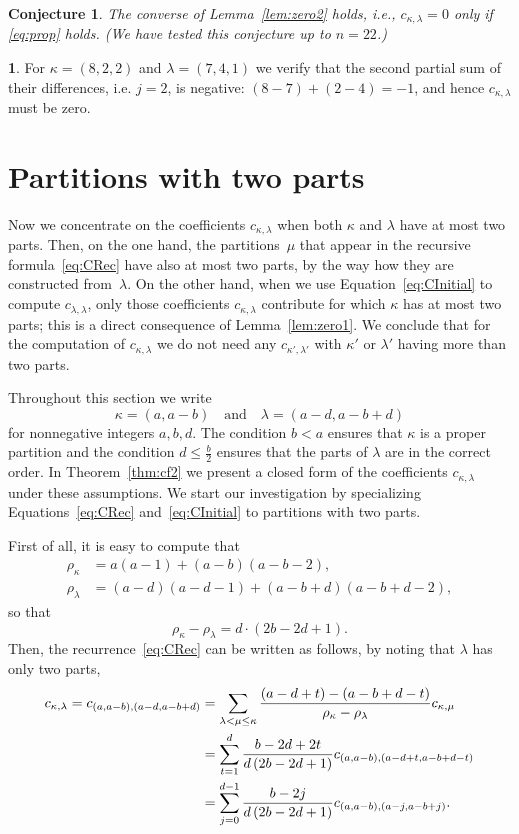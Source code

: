 \documentclass[10pt,oneside,american]{amsart}
\numberwithin{equation}{section}
\numberwithin{figure}{section}
\theoremstyle{plain}
\theoremstyle{definition}
\theoremstyle{remark}
\theoremstyle{plain}
\theoremstyle{definition}
\newtheorem{example}[thm]{\protect\examplename}
\theoremstyle{plain}
\theoremstyle{plain}
\newtheorem{conj}[thm]{Conjecture}
\providecommand{\examplename}{Example}
\begin{document}
\begin{conj}
  The converse of Lemma~\eqref{lem:zero2} holds, i.e., $c_{\kappa,\lambda}=0$
  only if \eqref{eq:prop} holds. (We have tested this conjecture up to
  $n=22$.)
\end{conj}

\begin{example}
  For $\kappa=(8,2,2)$ and $\lambda=(7,4,1)$ we verify that the second
  partial sum of their differences, i.e. $j=2$, is negative:
  $(8-7)+(2-4)=-1$, and hence $c_{\kappa,\lambda}$ must be zero.
\end{example}


\section{Partitions with two parts}

Now we concentrate on the coefficients $c_{\kappa,\lambda}$ when both $\kappa$
and $\lambda$ have at most two parts. Then, on the one hand, the
partitions~$\mu$ that appear in the recursive formula~\eqref{eq:CRec} have
also at most two parts, by the way how they are constructed from~$\lambda$. On
the other hand, when we use Equation~\eqref{eq:CInitial} to compute
$c_{\lambda,\lambda}$, only those coefficients $c_{\kappa,\lambda}$ contribute
for which $\kappa$ has at most two parts; this is a direct consequence of
Lemma~\ref{lem:zero1}.  We conclude that for the computation of
$c_{\kappa,\lambda}$ we do not need any $c_{\kappa',\lambda'}$ with $\kappa'$
or $\lambda'$ having more than two parts.

\noindent
Throughout this section we write
\[
  \kappa=(a,a-b) \quad\text{and}\quad \lambda=(a-d,a-b+d)
\]
for nonnegative integers $a,b,d$.  The condition $b<a$ ensures that $\kappa$
is a proper partition and the condition $d\leq\frac{b}{2}$ ensures that the
parts of $\lambda$ are in the correct order. In Theorem~\ref{thm:cf2} we
present a closed form of the coefficients $c_{\kappa,\lambda}$ under these
assumptions. We start our investigation by specializing
Equations~\eqref{eq:CRec} and~\eqref{eq:CInitial} to partitions with two
parts.

First of all, it is easy to compute that 
\begin{align*}
  \rho_{\kappa} &= a(a-1) + (a-b)(a-b-2), \\
  \rho_{\lambda} &= (a-d)(a-d-1) + (a-b+d)(a-b+d-2),
\end{align*}
so that
\[
  \rho_{\kappa}-\rho_{\lambda} = d\cdot(2b-2d+1).
\]
Then, the recurrence~\eqref{eq:CRec} can be written as follows, by noting that
$\lambda$ has only two parts,
\begin{align}\label{eq:rec2}
  c_{\kappa,\lambda} = c_{(a,a-b),(a-d,a-b+d)} &=
  \sum_{\lambda<\mu\leq\kappa}\frac{(a-d+t)-(a-b+d-t)}{\rho_{\kappa}-\rho_{\lambda}} c_{\kappa,\mu} \notag \\
  &= \sum_{t=1}^d\frac{b-2d+2t}{d\,(2b-2d+1)}c_{(a,a-b),(a-d+t,a-b+d-t)} \\
  &= \sum_{j=0}^{d-1} \frac{b-2j}{d\,(2b-2d+1)}c_{(a,a-b),(a-j,a-b+j)}. \notag
\end{align}
\end{document}
